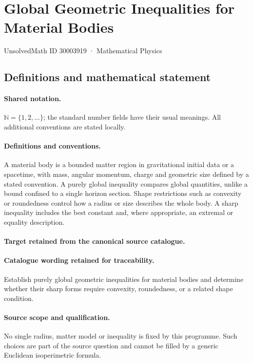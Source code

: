 \documentclass[11pt]{article}
\begin{document}
\setcounter{section}{30003918}
\section{Global Geometric Inequalities for Material Bodies}\label{30003919}
{\small UnsolvedMath ID 30003919 · Mathematical Physics}
\subsection{Definitions and mathematical statement}

\paragraph{Shared notation.}$\mathbb N=\{1,2,\ldots\}$; the standard number fields have their usual meanings. All additional conventions are stated locally.


\paragraph{Definitions and conventions.}
A material body is a bounded matter region in gravitational initial data or a spacetime, with mass, angular momentum, charge and geometric size defined by a stated convention. A purely global inequality compares global quantities, unlike a bound confined to a single horizon section. Shape restrictions such as convexity or roundedness control how a radius or size describes the whole body. A sharp inequality includes the best constant and, where appropriate, an extremal or equality description.

\paragraph{Target retained from the canonical source catalogue.}
\paragraph{Catalogue wording retained for traceability.}
Establish purely global geometric inequalities for material bodies and determine whether their sharp forms require convexity, roundedness, or a related shape condition.

\paragraph{Source scope and qualification.}
No single radius, matter model or inequality is fixed by this programme. Such choices are part of the source question and cannot be filled by a generic Euclidean isoperimetric formula.
\end{document}
